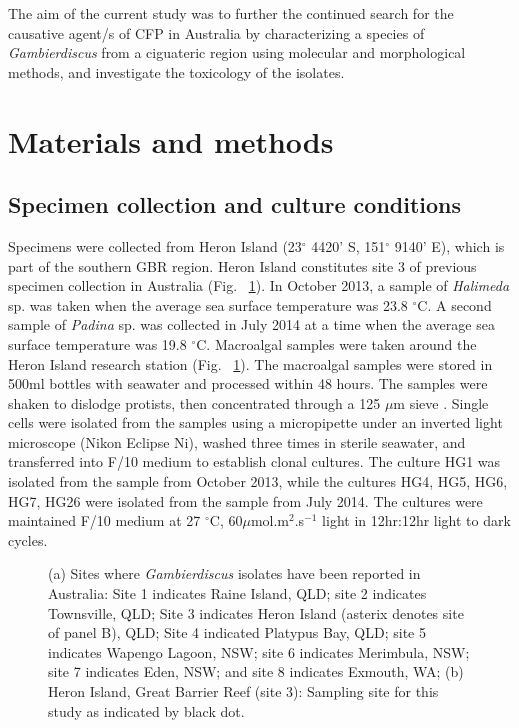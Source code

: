 \documentclass[12pt]{article}
\begin{document}
The aim of the current study was to further the continued search for the causative agent/s of CFP in Australia by characterizing a species of \emph{Gambierdiscus} from a ciguateric region using molecular and morphological methods, and investigate the toxicology of the isolates.

 \newpage
\section{Materials and methods}

\subsection{Specimen collection and culture conditions}
\FloatBarrier
Specimens were collected from Heron Island (23$^{\circ}$ 4420' S, 151$^{\circ}$ 9140' E), which is part of the southern GBR region. 
Heron Island constitutes site 3 of previous specimen collection in Australia (Fig. ~\ref{fig:OzSites}).
In October 2013, a sample of \emph{Halimeda} sp. was taken when the average sea surface temperature was 23.8 $^{\circ}$C. 
A second sample of \emph{Padina} sp. was collected in July 2014 at a time when the average sea surface temperature was 19.8 $^{\circ}$C.
Macroalgal samples were taken around the Heron Island research station (Fig. ~\ref{fig:OzSites}). 
The macroalgal samples were stored in 500ml bottles with seawater and processed within 48 hours. 
The samples were shaken to dislodge protists, then concentrated through a 125 $\mu$m sieve \citep{litaker2010global}. 
Single cells were isolated from the samples using a micropipette under an inverted light microscope (Nikon Eclipse Ni), washed three times in sterile seawater, and transferred into F/10 medium \citep{holmes1991strain} to establish clonal cultures.
The culture HG1 was isolated from the sample from October 2013, while the cultures HG4, HG5, HG6, HG7, HG26 were isolated from the sample from July 2014.
The cultures were maintained F/10 medium at 27 $^{\circ}$C, 60$\mu$mol.m$^{2}$.s$^{-1}$ light in 12hr:12hr light to dark cycles.

\begin{figure} 
\caption{(a) Sites where \textit{Gambierdiscus} isolates have been reported in Australia: Site 1 indicates Raine Island, QLD; site 2 indicates Townsville, QLD; Site 3 indicates Heron Island (asterix denotes site of panel B), QLD; Site 4 indicated Platypus Bay, QLD; site 5 indicates Wapengo Lagoon, NSW; site 6 indicates Merimbula, NSW; site 7 indicates Eden, NSW; and site 8 indicates Exmouth, WA; (b) Heron Island, Great Barrier Reef (site 3): Sampling site for this study as indicated by black dot.} 
\label{fig:OzSites}
\end{figure}
\end{document}
